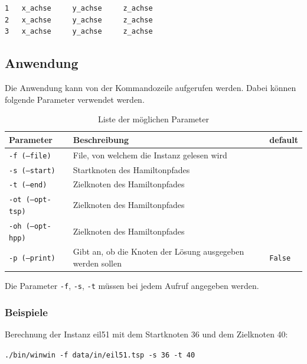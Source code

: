 \documentclass[11pt,a4paper]{article}
\begin{document}
\begin{verbatim}
1   x_achse     y_achse     z_achse
2   x_achse     y_achse     z_achse
3   x_achse     y_achse     z_achse
\end{verbatim}

\subsection{Anwendung}
Die Anwendung kann von der Kommandozeile aufgerufen werden. Dabei können folgende Parameter verwendet werden.

\begin{table}[H]
        \centering
        \begin{tabular}{| l | l | l |}
            \hline
            \textbf{Parameter}          & \textbf{Beschreibung}                                         & \textbf{default}      \\ \hline
            \texttt{-f (--file)}        & File, von welchem die Instanz gelesen wird                    &                       \\ \hline
            \texttt{-s (--start)}       & Startknoten des Hamiltonpfades                                &                       \\ \hline
            \texttt{-t (--end)}         & Zielknoten des Hamiltonpfades                                 &                       \\ \hline
            \texttt{-ot (--opt-tsp)}    & Zielknoten des Hamiltonpfades                                 &                       \\ \hline
            \texttt{-oh (--opt-hpp)}    & Zielknoten des Hamiltonpfades                                 &                       \\ \hline
            \texttt{-p (--print)}       & Gibt an, ob die Knoten der Lösung ausgegeben werden sollen    & \texttt{False}        \\ \hline
        \end{tabular}
        \caption{Liste der möglichen Parameter}
        \label{tab:parameter}
\end{table}

Die Parameter \texttt{-f}, \texttt{-s}, \texttt{-t} müssen bei jedem Aufruf angegeben werden.

\subsubsection{Beispiele}
Berechnung der Instanz eil51 mit dem Startknoten 36 und dem Zielknoten 40:
\begin{flushleft}
\texttt{./bin/winwin -f data/in/eil51.tsp -s 36 -t 40}
\end{flushleft}
\end{document}
